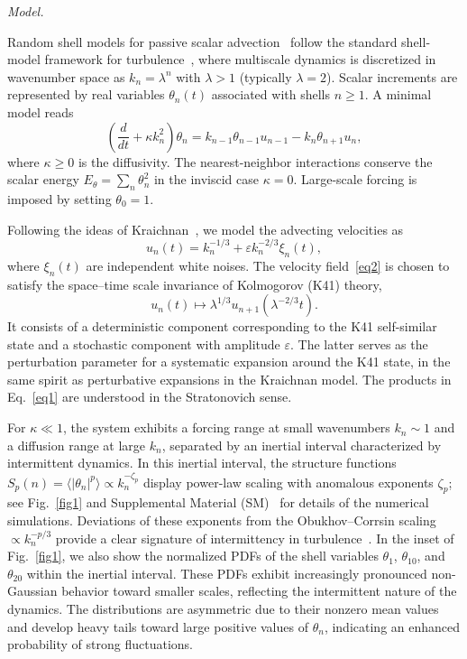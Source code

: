 \documentclass[aps,twocolumn,superscriptaddress]{revtex4-2}
\begin{document}
\textit{Model.}

Random shell models for passive scalar advection~\cite{wirth1996anomalous,benzi1997analytic,andersen1999shell} follow the standard shell-model framework for turbulence~\cite{frisch1995turbulence,biferale2003shell}, where multiscale dynamics is discretized in wavenumber space as $k_n = \lambda^n$ with $\lambda>1$ (typically $\lambda=2$). Scalar increments are represented by real variables $\theta_n(t)$ associated with shells $n\ge1$. A minimal model reads~\cite{jensen1992shell,benzi1997analytic,biferale2007minimal}
\begin{equation}
\left(\frac{d}{dt}+\kappa k_n^2\right)\theta_n
= k_{n-1}\theta_{n-1}u_{n-1}-k_n \theta_{n+1}u_n,
\label{eq1}
\end{equation}
where $\kappa\ge0$ is the diffusivity. The nearest-neighbor interactions conserve the scalar energy $E_\theta=\sum_n\theta_n^2$ in the inviscid case $\kappa=0$. Large-scale forcing is imposed by setting $\theta_0=1$.

Following the ideas of Kraichnan~\cite{kraichnan1968small,falkovich2001particles,frisch2007intermittency,cardy2008non}, we model the advecting velocities as
\begin{equation}
u_n(t) = k_n^{-1/3}+\varepsilon k_n^{-2/3} \xi_n(t),
\label{eq2}
\end{equation}
where $\xi_n(t)$ are independent white noises.
The velocity field~\eqref{eq2} is chosen to satisfy the space--time scale invariance of Kolmogorov (K41) theory,
\begin{equation}
u_n(t) \mapsto \lambda^{1/3} u_{n+1}(\lambda^{-2/3}t).
\end{equation}
It consists of a deterministic component corresponding to the K41 self-similar state and a stochastic component with amplitude $\varepsilon$. The latter serves as the perturbation parameter for a systematic expansion around the K41 state, in the same spirit as perturbative expansions in the Kraichnan model.
The products in Eq.~\eqref{eq1} are understood in the Stratonovich sense.

For $\kappa \ll 1$, the system exhibits a forcing range at small wavenumbers \(k_n\sim1\) and a diffusion range at large \(k_n\), separated by an inertial interval characterized by intermittent dynamics. In this inertial interval, the structure functions $S_p(n)=\langle|\theta_n|^p\rangle \propto k_n^{-\zeta_p}$ display power-law scaling with anomalous exponents $\zeta_p$; see Fig.~\ref{fig1} and Supplemental Material (SM)~\cite[\S VI]{SM} for details of the numerical simulations. Deviations of these exponents from the Obukhov--Corrsin scaling $\propto k_n^{-p/3}$ provide a clear signature of intermittency in turbulence~\cite{frisch1995turbulence}. In the inset of Fig.~\ref{fig1}, we also show the normalized PDFs of the shell variables $\theta_1$, $\theta_{10}$, and $\theta_{20}$ within the inertial interval. These PDFs exhibit increasingly pronounced non-Gaussian behavior toward smaller scales, reflecting the intermittent nature of the dynamics. The distributions are asymmetric due to their nonzero mean values and develop heavy tails toward large positive values of $\theta_n$, indicating an enhanced probability of strong fluctuations.
\end{document}
